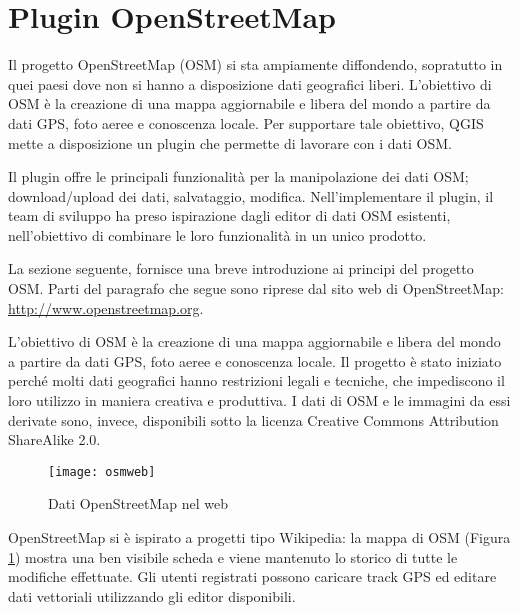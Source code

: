
\section{Plugin OpenStreetMap}\label{plugins_osm}


Il progetto OpenStreetMap (OSM) si sta ampiamente diffondendo, sopratutto in quei paesi dove 
non si hanno a disposizione dati geografici liberi.
L'obiettivo di OSM è la creazione di una mappa aggiornabile e libera del mondo a partire da
dati GPS, foto aeree e conoscenza locale.
Per supportare tale obiettivo, QGIS mette a disposizione un plugin che permette di lavorare 
con i dati OSM.

Il plugin offre le principali funzionalità per la manipolazione dei dati OSM; download/upload dei dati,
salvataggio, modifica. 
Nell'implementare il plugin, il team di sviluppo ha preso ispirazione dagli editor di 
dati OSM esistenti, nell'obiettivo di combinare le loro funzionalità in un unico prodotto.

La sezione seguente, fornisce una breve introduzione ai principi del progetto OSM.
Parti del paragrafo che segue sono riprese dal sito web di OpenStreetMap: \url{http://www.openstreetmap.org}.


L'obiettivo di OSM è la creazione di una mappa aggiornabile e libera del mondo a partire da
dati GPS, foto aeree e conoscenza locale.
Il progetto è stato iniziato perché molti dati geografici hanno restrizioni legali e tecniche,
che impediscono il loro utilizzo in maniera creativa e produttiva. 
I dati di OSM e le immagini da essi derivate sono, invece, disponibili sotto la licenza 
Creative Commons Attribution ShareAlike 2.0.

\begin{figure}[ht]
   \centering
   \texttt{[image: osmweb]}
   \caption{Dati OpenStreetMap nel web \nixcaption}\label{fig:osmweb}
\end{figure}

OpenStreetMap si è ispirato a progetti tipo Wikipedia: la mappa di OSM (Figura \ref{fig:osmweb}) 
mostra una ben visibile scheda  e viene mantenuto lo storico di tutte 
le modifiche effettuate. Gli utenti registrati possono caricare track GPS ed editare dati 
vettoriali utilizzando gli editor disponibili.

